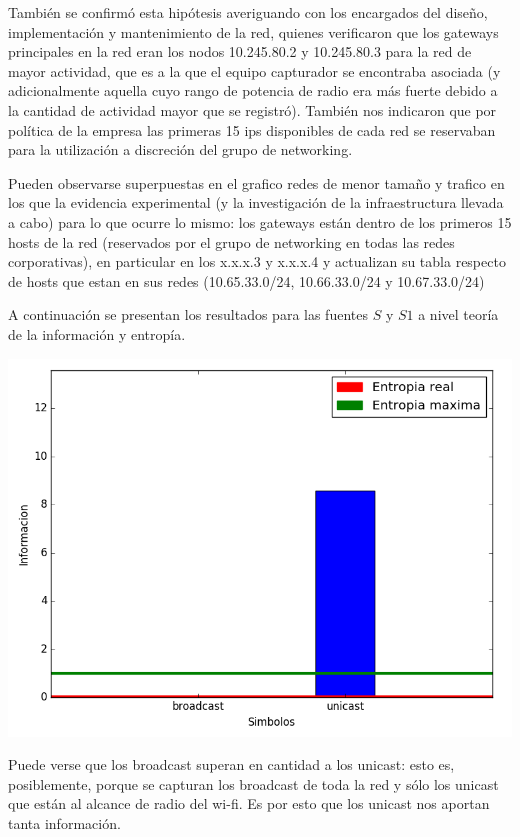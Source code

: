 También se confirmó esta hipótesis averiguando con los encargados del diseño, implementación y mantenimiento de la red, quienes verificaron que los gateways principales en la red eran los nodos 10.245.80.2 y 10.245.80.3 para la red de mayor actividad, que es a la que el equipo capturador se encontraba asociada (y adicionalmente aquella cuyo rango de potencia de radio era más fuerte debido a la cantidad de actividad mayor que se registró). También nos indicaron que por política de la empresa las primeras 15 ips disponibles de cada red se reservaban para la utilización a discreción del grupo de networking.

Pueden observarse superpuestas en el grafico redes de menor tamaño y trafico en los que la evidencia experimental (y la investigación de la infraestructura llevada a cabo) para lo que ocurre lo mismo: los gateways están dentro de los primeros 15 hosts de la red (reservados por el grupo de networking en todas las redes corporativas), en particular en los x.x.x.3 y x.x.x.4 y actualizan su tabla respecto de hosts que estan en sus redes (10.65.33.0/24, 10.66.33.0/24 y 10.67.33.0/24)

A continuación se presentan los resultados para las fuentes $S$ y $S1$ a nivel teoría de la información y entropía.

\begin{center}
\includegraphics[scale=0.7]{imagenes/captura-tcorp-fuente-s.png} 
\end{center}

Puede verse que los broadcast superan en cantidad a los unicast: esto es, posiblemente, porque se capturan los broadcast de toda la red y sólo los unicast que están al alcance de radio del wi-fi. Es por esto que los unicast nos aportan tanta información.

